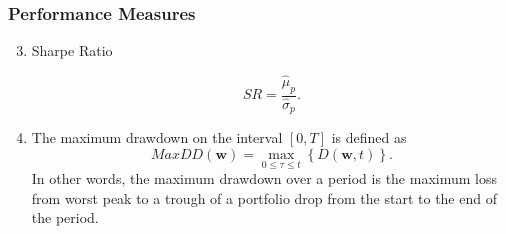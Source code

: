 \documentclass[pdf,9pt,xcolor=dvipsnames,hide notes]{beamer}
\begin{document}
\begin{frame}
	\frametitle{Performance Measures}
	
	\begin{enumerate}
		\setcounter{enumi}{2}
		
		\item Sharpe Ratio
		
		\begin{equation}
		SR=\frac{\widehat{\mu }_{p}}{\widehat{\sigma }_{p}}.
		\end{equation}
		
		\vspace{0.3cm}
		
			\item The maximum drawdown on the interval $[0,T]$ is defined as
		\begin{equation}
		MaxDD\left( \mathbf{w}\right) =\underset{0\leq \tau \leq t}{\max }\left\{
		D\left( \mathbf{w,}t\right) \right\} .
		\end{equation}
		In other words, the maximum drawdown over a period is the maximum loss from
		worst peak to a trough of a portfolio drop from the start to the end of the
		period.
		
		
	\end{enumerate}

%	
%	
	
\end{frame}
\end{document}
